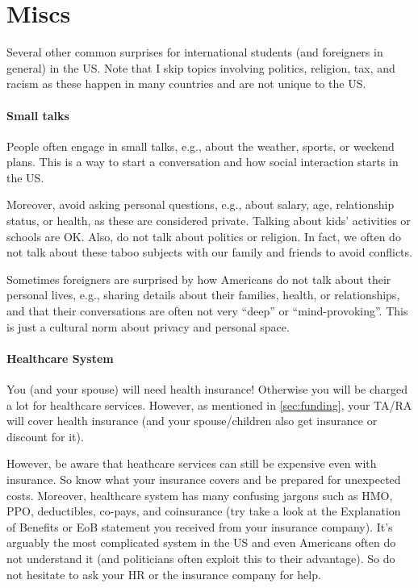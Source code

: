 \documentclass[oneside,11pt,dvipsnames]{book}
\begin{document}
  \section{Miscs}\label{sec:cultural-misc}
  
  Several other common surprises for international students (and foreigners in general) in the US. Note that I skip topics involving politics, religion, tax, and racism as these happen in many countries and are not unique to the US.

\paragraph{Small talks} People often engage in small talks, e.g., about the weather, sports, or weekend plans.  This is a way to start a conversation and how social interaction starts in the US.
  
Moreover, avoid asking personal questions, e.g., about salary, age, relationship status, or health, as these are considered private.  Talking about kids' activities or schools are OK. Also, do not talk about politics or religion.  In fact, we often do not talk about these taboo subjects with our family and friends to avoid conflicts.  

Sometimes foreigners are surprised by how Americans do not talk about their personal lives, e.g., sharing details about their families, health, or relationships, and that their conversations are often not very ``deep'' or ``mind-provoking''. This is just a cultural norm about privacy and personal space.

  \paragraph{Healthcare System}  You (and your spouse) will need health insurance! Otherwise you will be charged a lot for healthcare services. However, as mentioned in \autoref{sec:funding}, your  TA/RA  will cover health insurance (and your spouse/children also get insurance or discount for it). 
  
  However, be aware that heathcare services can still be expensive even with insurance. So  know what your insurance covers and be prepared for unexpected costs.  Moreover, healthcare system has many confusing jargons such as HMO, PPO, deductibles, co-pays, and coinsurance (try take a look at the Explanation of Benefits or EoB statement you received from your insurance company). It's arguably the most complicated system in the US and even Americans often do not understand it (and politicians often exploit this to their advantage).  So do not hesitate to ask your HR or the insurance company for help.
  
\end{document}
